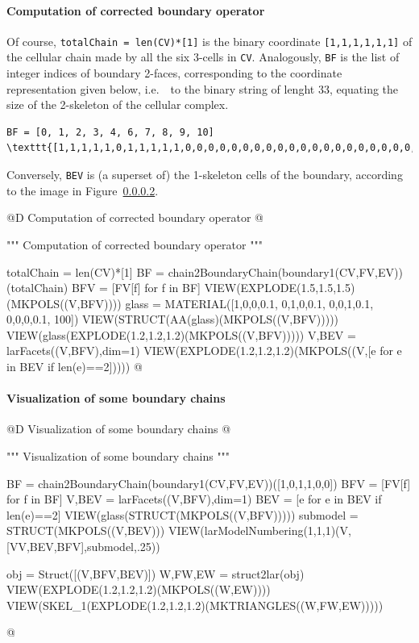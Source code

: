 \documentclass[11pt,oneside]{article}    %
\begin{document}
\paragraph{Computation of corrected boundary operator}
Of course, \texttt{totalChain = len(CV)*[1]} is the binary coordinate \texttt{[1,1,1,1,1,1]}
of the cellular chain made by all the six 3-cells in \texttt{CV}.
Analogously, \texttt{BF} is the list of integer indices of boundary 2-faces, corresponding to the coordinate representation given below, i.e.~~to the binary string of lenght 33, equating the size of the 2-skeleton of the cellular complex.
\begin{verbatim}
BF = [0, 1, 2, 3, 4, 6, 7, 8, 9, 10]
\texttt{[1,1,1,1,1,0,1,1,1,1,1,0,0,0,0,0,0,0,0,0,0,0,0,0,0,0,0,0,0,0,0,0,0]}
\end{verbatim}
Conversely, \texttt{BEV} is (a superset of) the 1-skeleton cells of the boundary, according to the image in Figure~\ref{}.

@D Computation of corrected boundary operator
@{""" Computation of corrected boundary operator """

totalChain = len(CV)*[1]
BF = chain2BoundaryChain(boundary1(CV,FV,EV))(totalChain)
BFV = [FV[f] for f in BF]
VIEW(EXPLODE(1.5,1.5,1.5)(MKPOLS((V,BFV))))
glass = MATERIAL([1,0,0,0.1,  0,1,0,0.1,  0,0,1,0.1, 0,0,0,0.1, 100])
VIEW(STRUCT(AA(glass)(MKPOLS((V,BFV)))))
VIEW(glass(EXPLODE(1.2,1.2,1.2)(MKPOLS((V,BFV)))))
V,BEV = larFacets((V,BFV),dim=1)
VIEW(EXPLODE(1.2,1.2,1.2)(MKPOLS((V,[e for e in BEV if len(e)==2]))))
@}

\paragraph{Visualization of some boundary chains}
@D Visualization of some boundary chains
@{""" Visualization of some boundary chains """

BF = chain2BoundaryChain(boundary1(CV,FV,EV))([1,0,1,1,0,0])
BFV = [FV[f] for f in BF]
V,BEV = larFacets((V,BFV),dim=1)
BEV = [e for e in BEV if len(e)==2]
VIEW(glass(STRUCT(MKPOLS((V,BFV)))))
submodel = STRUCT(MKPOLS((V,BEV)))
VIEW(larModelNumbering(1,1,1)(V,[VV,BEV,BFV],submodel,.25)) 


obj = Struct([(V,BFV,BEV)])
W,FW,EW = struct2lar(obj)
VIEW(EXPLODE(1.2,1.2,1.2)(MKPOLS((W,EW))))
VIEW(SKEL_1(EXPLODE(1.2,1.2,1.2)(MKTRIANGLES((W,FW,EW)))))

@}
\end{document}
